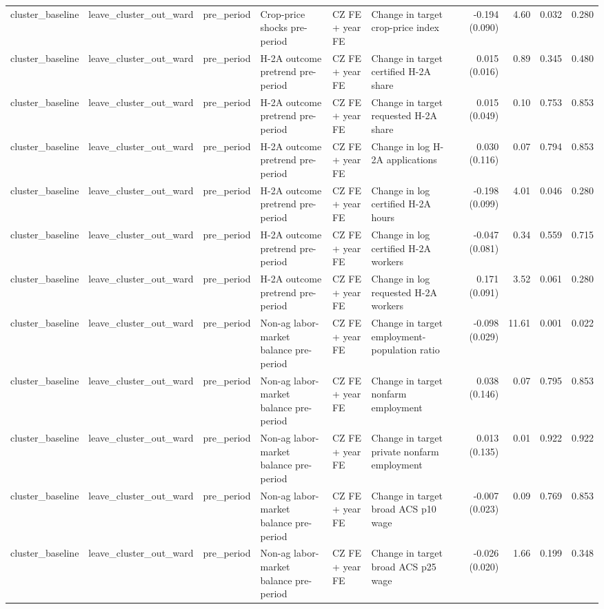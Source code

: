 \begin{tabular}{llllllrrrr}
cluster_baseline & leave_cluster_out_ward & pre_period & Crop-price shocks pre-period & CZ FE + year FE & Change in target crop-price index & -0.194 (0.090) & 4.60 & 0.032 & 0.280 \\
cluster_baseline & leave_cluster_out_ward & pre_period & H-2A outcome pretrend pre-period & CZ FE + year FE & Change in target certified H-2A share & 0.015 (0.016) & 0.89 & 0.345 & 0.480 \\
cluster_baseline & leave_cluster_out_ward & pre_period & H-2A outcome pretrend pre-period & CZ FE + year FE & Change in target requested H-2A share & 0.015 (0.049) & 0.10 & 0.753 & 0.853 \\
cluster_baseline & leave_cluster_out_ward & pre_period & H-2A outcome pretrend pre-period & CZ FE + year FE & Change in log H-2A applications & 0.030 (0.116) & 0.07 & 0.794 & 0.853 \\
cluster_baseline & leave_cluster_out_ward & pre_period & H-2A outcome pretrend pre-period & CZ FE + year FE & Change in log certified H-2A hours & -0.198 (0.099) & 4.01 & 0.046 & 0.280 \\
cluster_baseline & leave_cluster_out_ward & pre_period & H-2A outcome pretrend pre-period & CZ FE + year FE & Change in log certified H-2A workers & -0.047 (0.081) & 0.34 & 0.559 & 0.715 \\
cluster_baseline & leave_cluster_out_ward & pre_period & H-2A outcome pretrend pre-period & CZ FE + year FE & Change in log requested H-2A workers & 0.171 (0.091) & 3.52 & 0.061 & 0.280 \\
cluster_baseline & leave_cluster_out_ward & pre_period & Non-ag labor-market balance pre-period & CZ FE + year FE & Change in target employment-population ratio & -0.098 (0.029) & 11.61 & 0.001 & 0.022 \\
cluster_baseline & leave_cluster_out_ward & pre_period & Non-ag labor-market balance pre-period & CZ FE + year FE & Change in target nonfarm employment & 0.038 (0.146) & 0.07 & 0.795 & 0.853 \\
cluster_baseline & leave_cluster_out_ward & pre_period & Non-ag labor-market balance pre-period & CZ FE + year FE & Change in target private nonfarm employment & 0.013 (0.135) & 0.01 & 0.922 & 0.922 \\
cluster_baseline & leave_cluster_out_ward & pre_period & Non-ag labor-market balance pre-period & CZ FE + year FE & Change in target broad ACS p10 wage & -0.007 (0.023) & 0.09 & 0.769 & 0.853 \\
cluster_baseline & leave_cluster_out_ward & pre_period & Non-ag labor-market balance pre-period & CZ FE + year FE & Change in target broad ACS p25 wage & -0.026 (0.020) & 1.66 & 0.199 & 0.348 \\

\end{tabular}
